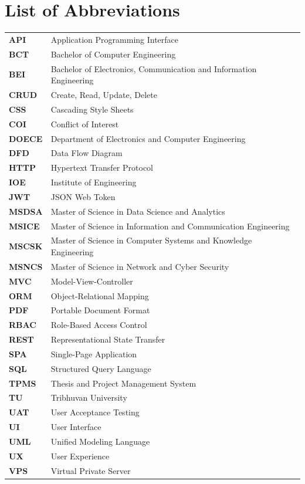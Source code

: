 \documentclass[12pt]{report}
\begin{document}
\chapter*{List of Abbreviations}
\begin{tabular}{l l}
\textbf{API} & Application Programming Interface \\
\textbf{BCT} & Bachelor of Computer Engineering \\
\textbf{BEI} & Bachelor of Electronics, Communication and Information Engineering \\
\textbf{CRUD} & Create, Read, Update, Delete \\
\textbf{CSS} & Cascading Style Sheets \\
\textbf{COI} & Conflict of Interest \\
\textbf{DOECE} & Department of Electronics and Computer Engineering \\
\textbf{DFD} & Data Flow Diagram \\
\textbf{HTTP} & Hypertext Transfer Protocol \\
\textbf{IOE} & Institute of Engineering \\
\textbf{JWT} & JSON Web Token \\
\textbf{MSDSA} & Master of Science in Data Science and Analytics \\
\textbf{MSICE} & Master of Science in Information and Communication Engineering \\
\textbf{MSCSK} & Master of Science in Computer Systems and Knowledge Engineering \\
\textbf{MSNCS} & Master of Science in Network and Cyber Security \\
\textbf{MVC} & Model-View-Controller \\
\textbf{ORM} & Object-Relational Mapping \\
\textbf{PDF} & Portable Document Format \\
\textbf{RBAC} & Role-Based Access Control \\
\textbf{REST} & Representational State Transfer \\
\textbf{SPA} & Single-Page Application \\
\textbf{SQL} & Structured Query Language \\
\textbf{TPMS} & Thesis and Project Management System \\
\textbf{TU} & Tribhuvan University \\
\textbf{UAT} & User Acceptance Testing \\
\textbf{UI} & User Interface \\
\textbf{UML} & Unified Modeling Language \\
\textbf{UX} & User Experience \\
\textbf{VPS} & Virtual Private Server \\
\end{tabular}
\end{document}
